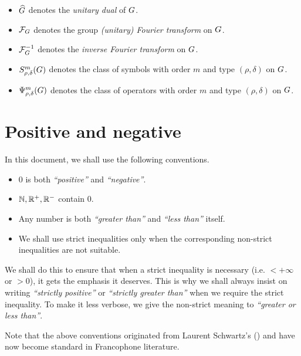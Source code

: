 \begin{itemize}
    \item ${\widehat{G}}$ denotes the \emph{unitary dual} of $G$.
    \item $\mathcal{F}_{G}$ denotes the group \emph{(unitary) Fourier transform} on $G$.
    \item $\mathcal{F}^{-1}_{G}$ denotes the \emph{inverse Fourier transform} on $G$.
    \item $S^{m}_{\rho, \delta}(G)$ denotes the class of symbols with order $m$ and type $(\rho, \delta)$ on $G$.
    \item $\Psi^{m}_{\rho, \delta}(G)$ denotes the class of operators with order $m$ and type $(\rho, \delta)$ on $G$.
\end{itemize}

\section*{Positive and negative}

In this document, we shall use the following conventions.

\begin{itemize}
    \item $0$ is both \emph{``positive''} and \emph{``negative''}.
    \item $\mathbb{N}, \mathbb{R}^+, \mathbb{R}^-$ contain $0$.
    \item Any number is both \emph{``greater than''} and \emph{``less than''} itself.
    \item We shall use strict inequalities only
        when the corresponding non-strict inequalities are not suitable.
\end{itemize}

We shall do this to ensure that
when a strict inequality is necessary (i.e. $< +\infty$ or $> 0$),
it gets the emphasis it deserves.
This is why we shall always insist on writing \emph{``strictly positive''} or \emph{``strictly greater than''} when we require the strict inequality.
To make it less verbose,
we give the non-strict meaning to \emph{``greater or less than''}.

Note that the above conventions originated from Laurent Schwartz's  (\cite{Schwartz1981})
and have now become standard in Francophone literature.

